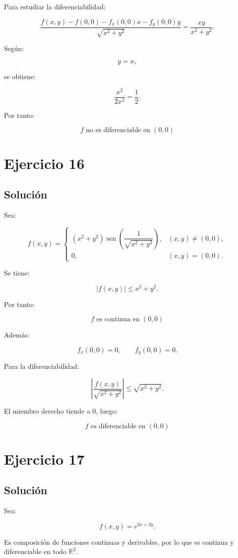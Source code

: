 \documentclass[11pt,a4paper]{article}
\newcommand{\R}{\mathbb{R}}
\newcommand{\sen}{\operatorname{sen}}
\begin{document}
Para estudiar la diferenciabilidad:

\[
\frac{
f(x,y)-f(0,0)-f_x(0,0)x-f_y(0,0)y
}{
\sqrt{x^2+y^2}
}
=
\frac{xy}{x^2+y^2}.
\]

Según:

\[
y=x,
\]

se obtiene:

\[
\frac{x^2}{2x^2}
=
\frac12.
\]

Por tanto:

\[
\boxed{
f\text{ no es diferenciable en }(0,0)
}
\]

\section{Ejercicio 16}
\subsection{Solución}

Sea:

\[
f(x,y)
=
\begin{cases}
(x^2+y^2)
\sen\left(
\dfrac1{\sqrt{x^2+y^2}}
\right),
&
(x,y)\neq(0,0),\\[2mm]
0,
&
(x,y)=(0,0).
\end{cases}
\]

Se tiene:

\[
|f(x,y)|
\leq
x^2+y^2.
\]

Por tanto:

\[
\boxed{
f\text{ es continua en }(0,0)
}
\]

Además:

\[
f_x(0,0)=0,
\qquad
f_y(0,0)=0.
\]

Para la diferenciabilidad:

\[
\left|
\frac{f(x,y)}
{\sqrt{x^2+y^2}}
\right|
\leq
\sqrt{x^2+y^2}.
\]

El miembro derecho tiende a \(0\), luego:

\[
\boxed{
f\text{ es diferenciable en }(0,0)
}
\]

\section{Ejercicio 17}
\subsection{Solución}

Sea:

\[
f(x,y)=e^{3x+2y}.
\]

Es composición de funciones continuas y derivables, por lo que es continua y diferenciable en todo \(\R^2\).
\end{document}
